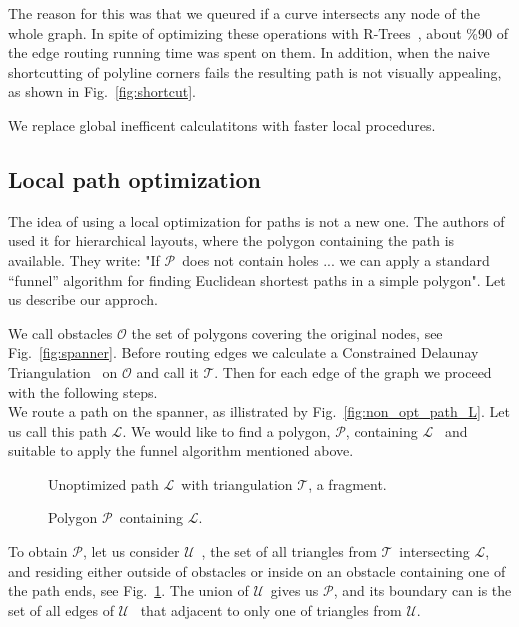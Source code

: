 \documentclass{gd-llncs}
\newcommand{\comm}[1]{}
\newcommand{\cdt}{$\mathcal{T}$}
\newcommand{\unpath}{$\mathcal{L}$}
\newcommand{\triset}{$\mathcal{U}$}
\newcommand{\plg}{$\mathcal{P}$}
\begin{document}
The reason for this was that we queured if a curve intersects any node of the whole graph. In spite of optimizing these operations with R-Trees~\cite{guttman1984r}, about \%90 of the edge routing running time was spent on them. In addition, when the naive shortcutting of polyline corners fails the resulting path is not visually appealing, as shown in Fig.~\ref{fig:shortcut}.

We replace global inefficent calculatitons with faster local procedures.
\subsection*{Local path optimization} {
  The idea of using a local optimization for paths is not a new one. The authors of~\cite{dobkin1997implementing} used it for hierarchical layouts, where the polygon containing the path is available. They write: "If \plg~does not contain holes ... we can apply a standard “funnel” algorithm \cite{chazelle1982theorem,hershberger1994computing} for finding Euclidean shortest paths in a simple polygon". Let us describe our approch.

  We call obstacles $\mathcal{O}$ the set of polygons covering the original nodes, see Fig.~\ref{fig:spanner}. Before routing edges we calculate a Constrained Delaunay Triangulation~\cite{delaunay1934sphere} on $\mathcal{O}$ and call it $\mathcal{T}$. Then for each edge of the graph we proceed with the following steps.\\
  We route a path on the spanner, as illistrated by Fig.~\ref{fig:non_opt_path_L}. Let us call this path \unpath. We would like to find a polygon, \plg, containing \unpath~ and suitable to apply the funnel algorithm mentioned above.
  \begin{figure}[!tbp]
    \centering
    \begin{minipage}[b]{\textwidth}
      
      \caption{Unoptimized path \unpath~with triangulation \cdt, a fragment.}
      \label{fig:non_opt_path_L}
    \end{minipage}
    \vfill
    \begin{minipage}[b]{\textwidth}
      
      \caption{Polygon \plg~containing \unpath.}
      \label{fig:polygon_with_path}
    \end{minipage}
  \end{figure}
  To obtain \plg, let us consider \triset~, the set of all triangles from \cdt~intersecting \unpath, and residing either outside of obstacles or inside on an obstacle containing one of the path ends, see Fig.~\ref{fig:polygon_with_path}.
  The union of \triset~gives us \plg, and its boundary can is the set of all edges of \triset~ that adjacent to only one of triangles from \triset.


}

\comm{
  \section{Further Examples}
}


\end{document}
